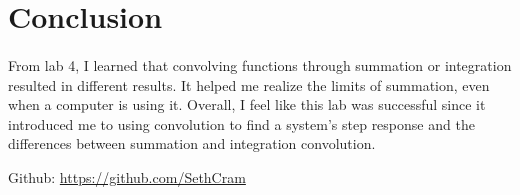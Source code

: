 \documentclass[12pt]{report}
\begin{document}
\section{Conclusion}


    \paragraph{} From lab 4, I learned that convolving functions through summation or integration resulted in different results. It helped me realize the limits of summation, even when a computer is using it. Overall, I feel like this lab was successful since it introduced me to using convolution to find a system's step response and the differences between summation and integration convolution. 

Github: \url{https://github.com/SethCram} 

\newpage
\end{document}
